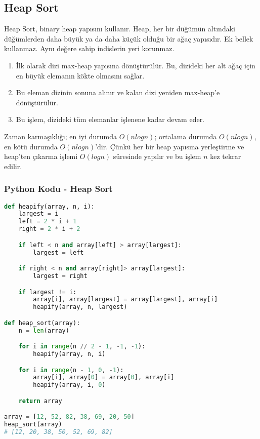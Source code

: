 \subsection{Heap Sort}

Heap Sort, binary heap yapısını kullanır. Heap, her bir düğümün altındaki düğümlerden daha büyük ya da daha küçük olduğu bir ağaç yapısıdır. Ek bellek kullanmaz. Aynı değere sahip indislerin yeri korunmaz.

\begin{enumerate}
    \item İlk olarak dizi max-heap yapısına dönüştürülür. Bu, dizideki her alt ağaç için en büyük elemanın kökte olmasını sağlar.
    \item Bu eleman dizinin sonuna alınır ve kalan dizi yeniden max-heap'e dönüştürülür.
    \item Bu işlem, dizideki tüm elemanlar işlenene kadar devam eder.
\end{enumerate}

Zaman karmaşıklığı; en iyi durumda $O(nlogn)$; ortalama durumda $O(nlogn)$, en kötü durumda $O(nlogn)$'dir. Çünkü her bir heap yapısına yerleştirme ve heap'ten çıkarma işlemi $O(logn)$ süresinde yapılır ve bu işlem $n$ kez tekrar edilir.

\subsubsection{Python Kodu - Heap Sort}

\begin{lstlisting}[language=Python]
def heapify(array, n, i):
    largest = i
    left = 2 * i + 1
    right = 2 * i + 2

    if left < n and array[left] > array[largest]:
        largest = left

    if right < n and array[right]> array[largest]:
        largest = right

    if largest != i:
        array[i], array[largest] = array[largest], array[i]
        heapify(array, n, largest)

def heap_sort(array):
    n = len(array)

    for i in range(n // 2 - 1, -1, -1):
        heapify(array, n, i)

    for i in range(n - 1, 0, -1):
        array[i], array[0] = array[0], array[i]
        heapify(array, i, 0)

    return array

array = [12, 52, 82, 38, 69, 20, 50]
heap_sort(array)
# [12, 20, 38, 50, 52, 69, 82]
\end{lstlisting}

